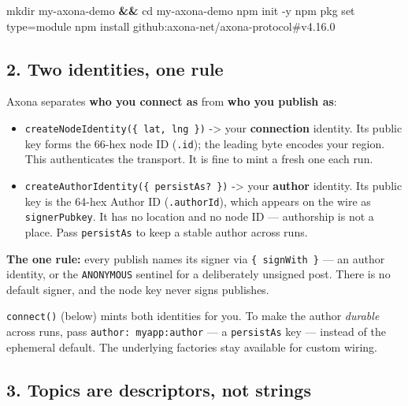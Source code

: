 \documentclass[
  nobib]{tufte-handout}
\newenvironment{Shaded}{}{}
\newcommand{\AttributeTok}[1]{\textcolor[rgb]{0.49,0.56,0.16}{#1}}
\newcommand{\BuiltInTok}[1]{\textcolor[rgb]{0.00,0.50,0.00}{#1}}
\newcommand{\ExtensionTok}[1]{#1}
\newcommand{\FunctionTok}[1]{\textcolor[rgb]{0.02,0.16,0.49}{#1}}
\newcommand{\KeywordTok}[1]{\textcolor[rgb]{0.00,0.44,0.13}{\textbf{#1}}}
\newcommand{\NormalTok}[1]{#1}
\providecommand{\tightlist}{%
  \setlength{\itemsep}{0pt}\setlength{\parskip}{0pt}}
\begin{document}
\begin{Shaded}
\begin{Highlighting}[]
\FunctionTok{mkdir}\NormalTok{ my{-}axona{-}demo }\KeywordTok{\&\&} \BuiltInTok{cd}\NormalTok{ my{-}axona{-}demo}
\ExtensionTok{npm}\NormalTok{ init }\AttributeTok{{-}y}
\ExtensionTok{npm}\NormalTok{ pkg set type=module}
\ExtensionTok{npm}\NormalTok{ install github:axona{-}net/axona{-}protocol\#v4.16.0}
\end{Highlighting}
\end{Shaded}

\subsection{2. Two identities, one rule}\label{two-identities-one-rule}

Axona separates \textbf{who you connect as} from \textbf{who you publish
as}:

\begin{itemize}
\tightlist
\item
  \texttt{createNodeIdentity(\{\ lat,\ lng\ \})} -\textgreater{} your
  \textbf{connection} identity. Its public key forms the 66-hex node ID
  (\texttt{.id}); the leading byte encodes your region. This
  authenticates the transport. It is fine to mint a fresh one each run.
\item
  \texttt{createAuthorIdentity(\{\ persistAs?\ \})} -\textgreater{} your
  \textbf{author} identity. Its public key is the 64-hex Author ID
  (\texttt{.authorId}), which appears on the wire as
  \texttt{signerPubkey}. It has no location and no node ID ---
  authorship is not a place. Pass \texttt{persistAs} to keep a stable
  author across runs.
\end{itemize}

\textbf{The one rule:} every publish names its signer via
\texttt{\{\ signWith\ \}} --- an author identity, or the
\texttt{ANONYMOUS} sentinel for a deliberately unsigned post. There is
no default signer, and the node key never signs publishes.

\texttt{connect()} (below) mints both identities for you. To make the
author \emph{durable} across runs, pass
\texttt{author:\ \textquotesingle{}myapp:author\textquotesingle{}} --- a
\texttt{persistAs} key --- instead of the ephemeral default. The
underlying factories stay available for custom wiring.

\subsection{3. Topics are descriptors, not
strings}\label{topics-are-descriptors-not-strings}
\end{document}
